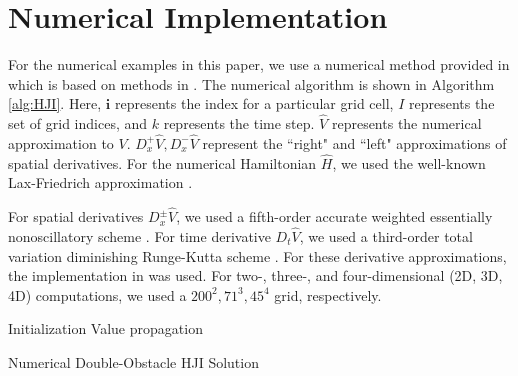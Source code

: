 \section{Numerical Implementation \label{sec:example}}
For the numerical examples in this paper, we use a numerical method provided in \cite{fisac15} which is based on methods in \cite{mitchell05, sethian96}. The numerical algorithm is shown in Algorithm \ref{alg:HJI}. Here, $\mathbf{i}$ represents the index for a particular grid cell, $I$ represents the set of grid indices, and $k$ represents the time step.  $\hat{V}$ represents the numerical approximation to $V$. $D^+_x\hat{V}, D^-_x\hat{V}$ represent the ``right" and ``left" approximations of spatial derivatives. For the numerical Hamiltonian $\hat{H}$, we used the well-known Lax-Friedrich approximation \cite{mitchell-thesis, osher91}.

For spatial derivatives $D^\pm_x\hat{V}$, we used a fifth-order accurate weighted essentially nonoscillatory scheme \cite{osher91,osher03}. For time derivative $D_t \hat{V}$, we used a third-order total variation diminishing Runge-Kutta scheme \cite{osher03, shu88}. For these derivative approximations, the implementation in \cite{LSToolbox} was used. For two-, three-, and four-dimensional (2D, 3D, 4D) computations, we used a $200^2, 71^3, 45^4$ grid, respectively.

\begin{algorithm}[h] 
 \BlankLine
 Initialization\DontPrintSemicolon\;\PrintSemicolon
   Value propagation\DontPrintSemicolon\;\PrintSemicolon
 \caption{Numerical Double-Obstacle HJI Solution\label{alg:HJI}}
\end{algorithm}

